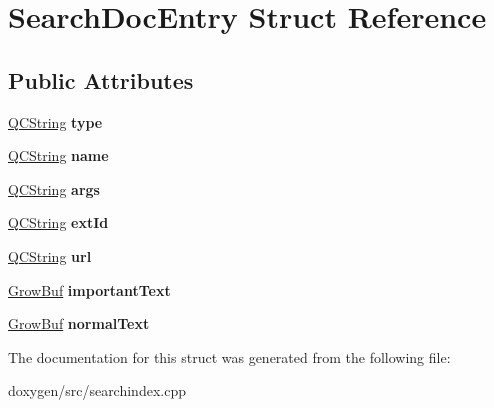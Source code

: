 \hypertarget{struct_search_doc_entry}{}\section{Search\+Doc\+Entry Struct Reference}
\label{struct_search_doc_entry}
\subsection*{Public Attributes}
\begin{DoxyCompactItemize}
\item 
\mbox{\label{struct_search_doc_entry_a628b826e7aaa2e3d9fca5524fe6f7ce2}} 
\mbox{\hyperlink{class_q_c_string}{Q\+C\+String}} {\bfseries type}
\item 
\mbox{\label{struct_search_doc_entry_a1fdc0594e9a3cde5c97802611d2dd6c0}} 
\mbox{\hyperlink{class_q_c_string}{Q\+C\+String}} {\bfseries name}
\item 
\mbox{\label{struct_search_doc_entry_a037c1fb6101ce91538d56b0947d0835a}} 
\mbox{\hyperlink{class_q_c_string}{Q\+C\+String}} {\bfseries args}
\item 
\mbox{\label{struct_search_doc_entry_af346c3d58867e1235d51656c9a9951d4}} 
\mbox{\hyperlink{class_q_c_string}{Q\+C\+String}} {\bfseries ext\+Id}
\item 
\mbox{\label{struct_search_doc_entry_abe8caf3bff9736a11702102da14232aa}} 
\mbox{\hyperlink{class_q_c_string}{Q\+C\+String}} {\bfseries url}
\item 
\mbox{\label{struct_search_doc_entry_a70ac96a54611c810bf88a36bb77898e2}} 
\mbox{\hyperlink{class_grow_buf}{Grow\+Buf}} {\bfseries important\+Text}
\item 
\mbox{\label{struct_search_doc_entry_abab47279dc03fb989c8e32a08731b17b}} 
\mbox{\hyperlink{class_grow_buf}{Grow\+Buf}} {\bfseries normal\+Text}
\end{DoxyCompactItemize}


The documentation for this struct was generated from the following file\+:\begin{DoxyCompactItemize}
\item 
doxygen/src/searchindex.\+cpp\end{DoxyCompactItemize}

